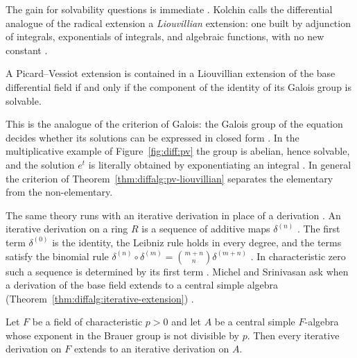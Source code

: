 The gain for solvability questions is immediate
\cite[pp.~5--6]{Kolchin1948PicardVessiot}. Kolchin calls the
differential analogue of the radical extension a \emph{Liouvillian}
extension: one built by adjunction of integrals, exponentials of
integrals, and algebraic functions, with no new constant
\cite[pp.~5--6]{Kolchin1948PicardVessiot}.

\begin{theorem}\label{thm:diffalg:pv-liouvillian}
A Picard--Vessiot extension is contained in a Liouvillian extension of
the base differential field if and only if the component of the identity
of its Galois group is solvable.
\end{theorem}

This is the analogue of the criterion of Galois: the Galois group of the
equation decides whether its solutions can be expressed in closed form
\cite[pp.~5--6]{Kolchin1948PicardVessiot}. In the multiplicative example
of Figure~\ref{fig:diff:pv} the group is abelian, hence solvable, and the
solution $e^t$ is literally obtained by exponentiating an integral
\cite[pp.~249--250]{HubbardLundell2011}. In general the criterion of
Theorem~\ref{thm:diffalg:pv-liouvillian} separates the elementary from
the non-elementary.

The same theory runs with an iterative derivation in place of a derivation
\cite[p.~1]{MichelSrinivasan2026}. An iterative derivation on a ring $R$ is a
sequence of additive maps $\delta^{(n)}$ \cite[p.~1]{MichelSrinivasan2026}.
The first term $\delta^{(0)}$ is the identity, the Leibniz rule holds in every
degree, and the terms satisfy the binomial rule
$\delta^{(n)}\circ\delta^{(m)}=\binom{m+n}{n}\delta^{(m+n)}$
\cite[p.~1]{MichelSrinivasan2026}. In characteristic zero such a sequence is
determined by its first term \cite[p.~2]{MichelSrinivasan2026}. Michel and
Srinivasan ask when a derivation of the base field extends to a central simple
algebra (Theorem~\ref{thm:diffalg:iterative-extension})
\cite[p.~1]{MichelSrinivasan2026}.

\begin{theorem}\label{thm:diffalg:iterative-extension}
Let $F$ be a field of characteristic $p>0$ and let $A$ be a central simple
$F$-algebra whose exponent in the Brauer group is not divisible by $p$.
Then every iterative derivation on $F$ extends to an iterative derivation
on $A$.
\end{theorem}

